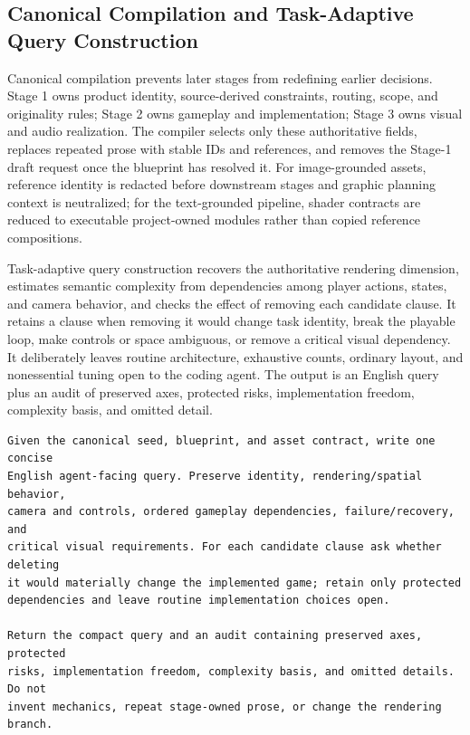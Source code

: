 \documentclass{article}
\begin{document}
\subsection{Canonical Compilation and Task-Adaptive Query Construction}
\label{app:canonical_compact}

Canonical compilation prevents later stages from redefining earlier decisions. Stage 1 owns product identity, source-derived constraints, routing, scope, and originality rules; Stage 2 owns gameplay and implementation; Stage 3 owns visual and audio realization. The compiler selects only these authoritative fields, replaces repeated prose with stable IDs and references, and removes the Stage-1 draft request once the blueprint has resolved it. For image-grounded assets, reference identity is redacted before downstream stages and graphic planning context is neutralized; for the text-grounded pipeline, shader contracts are reduced to executable project-owned modules rather than copied reference compositions.

Task-adaptive query construction recovers the authoritative rendering dimension, estimates semantic complexity from dependencies among player actions, states, and camera behavior, and checks the effect of removing each candidate clause. It retains a clause when removing it would change task identity, break the playable loop, make controls or space ambiguous, or remove a critical visual dependency. It deliberately leaves routine architecture, exhaustive counts, ordinary layout, and nonessential tuning open to the coding agent. The output is an English query plus an audit of preserved axes, protected risks, implementation freedom, complexity basis, and omitted detail.

\begin{tcolorbox}[enhanced,breakable,colback=white,colframe=black,title=\textbf{Prompt: Task-Adaptive Query Construction},fonttitle=\small]
\begin{Verbatim}[fontsize=\scriptsize]
Given the canonical seed, blueprint, and asset contract, write one concise
English agent-facing query. Preserve identity, rendering/spatial behavior,
camera and controls, ordered gameplay dependencies, failure/recovery, and
critical visual requirements. For each candidate clause ask whether deleting
it would materially change the implemented game; retain only protected
dependencies and leave routine implementation choices open.

Return the compact query and an audit containing preserved axes, protected
risks, implementation freedom, complexity basis, and omitted details. Do not
invent mechanics, repeat stage-owned prose, or change the rendering branch.
\end{Verbatim}
\end{tcolorbox}
\end{document}

